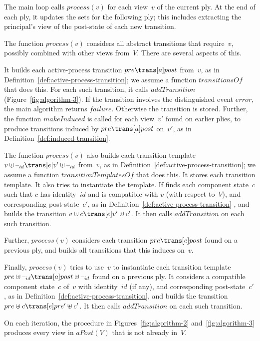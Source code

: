The main loop calls $process(v)$ for each view~$v$ of the current ply.  At the
end of each ply, it updates the sets for the following ply; this includes
extracting the principal's view of the post-state of each new transition. 

The function $process(v)$ considers all abstract transitions that require~$v$,
possibly combined with other views from~$V$.  There are several aspects of
this. 

It builds each active-process transition $pre \trans[a] post$ from~$v$, as in
Definition~\ref{def:active-process-transition}; we assume a function
$transitionsOf$ that does this.  For each such transition, it calls
$addTransition$ (Figure~\ref{fig:algorithm-3}).  If the transition involves
the distinguished event $error$, the main algorithm returns $failure$.
Otherwise the transition is stored.  Further, the function $makeInduced$ is
called for each view~$v'$ found on earlier plies, to produce transitions
induced by $pre \trans[a] post$ on~$v'$, as in
Definition~\ref{def:induced-transition}.

The function $process(v)$ also builds each transition template $v \uplus
\hole{id} \trans[e] v' \uplus \hole{id}$ from~$v$, as in
Definition~\ref{def:active-process-transition}; we assume a function
$transitionTemplatesOf$ that does this.  It stores each transition template.
It also tries to instantiate the template.  If finds each component state~$c$
such that $c$ has identity~$id$ and is compatible with $v$ (with respect
to~$V$), and corresponding post-state~$c'$, as in
Definition~\ref{def:active-process-transition} , and builds
the transition $v \uplus c \trans[e] v' \uplus c'$.  It then calls
$addTransition$ on each such transition.

Further, $process(v)$ considers each transition $pre \trans[e] post$ found on
a previous ply, and builds all transitions that this induces on~$v$.

Finally, $process(v)$ tries to use~$v$ to instantiate each transition template
$pre \uplus \hole{id} \trans[a] post \uplus \hole{id}$ found on a previous
ply.  It considers a compatible component state~$c$ of~$v$ with identity~$id$
(if any), and corresponding post-state~$c'$, as in
Definition~\ref{def:active-process-transition}, and builds the transition $pre
\uplus c \trans[e] pre' \uplus c'$.  It then calls $addTransition$ on each
such transition.


\begin{lemma}
On each iteration, the procedure in Figures~\ref{fig:algorithm-2}
and~\ref{fig:algorithm-3} produces every view in $aPost(V)$ that is not
already in~$V$.
\end{lemma}

